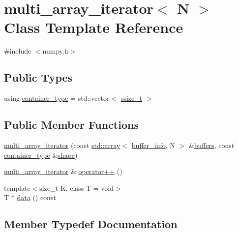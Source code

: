\hypertarget{classmulti__array__iterator}{}\section{multi\+\_\+array\+\_\+iterator$<$ N $>$ Class Template Reference}
\label{classmulti__array__iterator}


{\ttfamily \#include $<$numpy.\+h$>$}

\subsection*{Public Types}
\begin{DoxyCompactItemize}
\item 
using \mbox{\hyperlink{classmulti__array__iterator_acae334d3b88a49fe7301a79d04a02563}{container\+\_\+type}} = std\+::vector$<$ \mbox{\hyperlink{detail_2common_8h_ac430d16fc097b3bf0a7469cfd09decda}{ssize\+\_\+t}} $>$
\end{DoxyCompactItemize}
\subsection*{Public Member Functions}
\begin{DoxyCompactItemize}
\item 
\mbox{\hyperlink{classmulti__array__iterator_a658a64d1b635a6e581fc606913490dec}{multi\+\_\+array\+\_\+iterator}} (const \mbox{\hyperlink{_s_d_l__opengl__glext_8h_a52f38e7d822a46377fde7a02708eedb1}{std\+::array}}$<$ \mbox{\hyperlink{structbuffer__info}{buffer\+\_\+info}}, N $>$ \&\mbox{\hyperlink{_s_d_l__opengl__glext_8h_acaf3212fc88caa23745613e709a3e869}{buffers}}, const \mbox{\hyperlink{classmulti__array__iterator_acae334d3b88a49fe7301a79d04a02563}{container\+\_\+type}} \&\mbox{\hyperlink{abstract_8h_aa30a150670a6aaebe0bf9bcf91b00b35}{shape}})
\item 
\mbox{\hyperlink{classmulti__array__iterator}{multi\+\_\+array\+\_\+iterator}} \& \mbox{\hyperlink{classmulti__array__iterator_a7e20dd4a6014bf9d69995f6e8825ee90}{operator++}} ()
\item 
{\footnotesize template$<$size\+\_\+t K, class T  = void$>$ }\\T $\ast$ \mbox{\hyperlink{classmulti__array__iterator_aae21619a2f9dc2b336a9228039294d83}{data}} () const
\end{DoxyCompactItemize}


\subsection{Member Typedef Documentation}
\mbox{\label{classmulti__array__iterator_acae334d3b88a49fe7301a79d04a02563}} 
